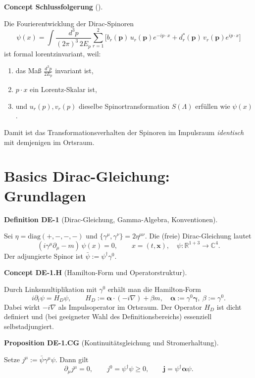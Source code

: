 \documentclass[10pt, letterpaper]{article}
\newcommand{\R}{\mathbb{R}}
\newcommand{\C}{\mathbb{C}}
\newcommand{\CustomHeading}[3]{%
  \par\medskip\noindent%
  \textbf{#1 #2} \textnormal{(#3)}.\enskip%
}
\newenvironment{DEF}[2]{\begin{unitbox}\CustomHeading{Definition}{#1}{#2}}{\end{unitbox}}
\newenvironment{PROP}[2]{\begin{unitbox}\CustomHeading{Proposition}{#1}{#2}}{\end{unitbox}}
\newenvironment{CONC}[2]{\begin{unitbox}\CustomHeading{Concept}{#1}{#2}}{\end{unitbox}}
\begin{document}
\begin{CONC}{Schlussfolgerung}{}
Die Fourierentwicklung der Dirac-Spinoren
\[
\psi(x)
=\int\!\frac{d^3p}{(2\pi)^3\,2E_p}
\sum_{r=1}^2
\big[b_r(\mathbf p)\,u_r(\mathbf p)e^{-ip\cdot x}
+d_r^*(\mathbf p)\,v_r(\mathbf p)e^{ip\cdot x}\big]
\]
ist formal lorentzinvariant, weil:
\begin{enumerate}[label=\roman*)]
\item das Maß $\frac{d^3p}{2E_p}$ invariant ist,
\item $p\!\cdot\!x$ ein Lorentz-Skalar ist,
\item und $u_r(p),v_r(p)$ dieselbe Spinortransformation $S(\Lambda)$ erfüllen wie $\psi(x)$.
\end{enumerate}
Damit ist das Transformationsverhalten der Spinoren im Impulsraum \emph{identisch} mit demjenigen im Ortsraum.
\end{CONC}


\pagebreak


\section{Basics Dirac-Gleichung: Grundlagen}

\begin{DEF}{DE-1}{Dirac-Gleichung, Gamma-Algebra, Konventionen}
Sei $\eta=\mathrm{diag}(+,-,-,-)$ und $\{\gamma^\mu,\gamma^\nu\}=2\eta^{\mu\nu}$. Die (freie) Dirac-Gleichung lautet
\[
 (i\gamma^\mu\partial_\mu - m)\,\psi(x)=0,\qquad x=(t,\mathbf x),\quad \psi:\R^{1+3}\to\C^4.
\]
Der adjungierte Spinor ist $\bar\psi:=\psi^\dagger\gamma^0$.
\end{DEF}

\begin{CONC}{DE-1.H}{Hamilton-Form und Operatorstruktur}
Durch Linksmultiplikation mit $\gamma^0$ erhält man die Hamilton-Form
\[
 i\partial_t\psi=H_D\psi,\qquad H_D:=\boldsymbol{\alpha}\cdot(-i\nabla)+\beta m,\quad
 \boldsymbol{\alpha}:=\gamma^0\boldsymbol{\gamma},\ \beta:=\gamma^0.
\]
Dabei wirkt $-i\nabla$ als Impulsoperator im Ortsraum. Der Operator $H_D$ ist dicht definiert und (bei geeigneter Wahl des Definitionsbereichs) essenziell selbstadjungiert.
\end{CONC}

\begin{PROP}{DE-1.CG}{Kontinuitätsgleichung und Stromerhaltung}
Setze $j^\mu:=\bar\psi\gamma^\mu\psi$. Dann gilt
\[
\partial_\mu j^\mu=0,\qquad j^0=\psi^\dagger\psi\ge 0,\qquad \mathbf j=\psi^\dagger\boldsymbol{\alpha}\psi.
\]
\end{PROP}
\end{document}
